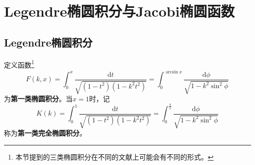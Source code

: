 

 



\chapter{Legendre椭圆积分与Jacobi椭圆函数}\label{椭圆积分与Jacobi椭圆函数}

\section{Legendre椭圆积分}

定义函数\footnote{本节提到的三类椭圆积分在不同的文献上可能会有不同的形式。}
\begin{equation}
	F(k,x) = \int_0^x \frac{\mathrm{d}t}{\sqrt{(1-t^2)(1-k^2t^2)}} = \int_0^{\arcsin x} \frac{\mathrm{d}\phi}{\sqrt{1-k^2\sin^2\phi}}
	\label{第一类椭圆积分-定义}
\end{equation}
为{\bf 第一类椭圆积分}。当$x=1$时，记
\begin{equation}
	K(k) = \int_0^1 \frac{\mathrm{d}t}{\sqrt{(1-t^2)(1-k^2t^2)}} = \int_0^{\frac{\pi}{2}} \frac{\mathrm{d}\phi}{\sqrt{1-k^2\sin^2\phi}}
	\label{chp6:第一类完全椭圆积分-定义}
\end{equation}
称为{\bf 第一类完全椭圆积分}。

